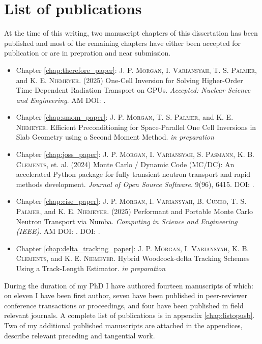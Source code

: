 \section{List of publications}

At the time of this writing, two manuscript chapters of this dissertation has been published and most of the remaining chapters have either been accepted for publication or are in prepration and near submission.
\begin{itemize}
    \item Chapter \ref{chap:therefore_paper}: \textsc{J. P. Morgan}, \textsc{I. Variansyah}, \textsc{T. S. Palmer}, and \textsc{K. E. Niemeyer}. (2025) One-Cell Inversion for Solving Higher-Order Time-Dependent Radiation Transport on GPUs. \emph{Accepted: Nuclear Science and Engineering}. AM DOI: .

    \item Chapter \ref{chap:smom_paper}: \textsc{J. P. Morgan},  \textsc{T. S. Palmer}, and \textsc{K. E. Niemeyer}. Efficient Preconditioning for Space-Parallel One Cell Inversions in Slab Geometry using a Second Moment Method. \emph{in preparation}

    \item Chapter \ref{chap:joss_paper}: \textsc{J. P. Morgan}, \textsc{I. Variansyah}, \textsc{S. Pasmann}, \textsc{K. B. Clements}, et. al. (2024) Monte Carlo / Dynamic Code (MC/DC): An accelerated Python package for fully transient neutron transport and rapid methods development. \emph{Journal of Open Source Software}. 9(96), 6415. DOI: .

    \item Chapter \ref{chap:cise_paper}: \textsc{J. P. Morgan}, \textsc{I. Variansyah}, \textsc{B. Cuneo}, \textsc{T. S. Palmer}, and \textsc{K. E. Niemeyer}. (2025) Performant and Portable Monte Carlo Neutron Transport via Numba. \emph{Computing in Science and Engineering (IEEE)}. AM DOI: . DOI: .

    \item Chapter \ref{chap:delta_tracking_paper}: \textsc{J. P. Morgan}, \textsc{I. Variansyah}, \textsc{K. B. Clements}, and \textsc{K. E. Niemeyer}. Hybrid Woodcock-delta Tracking Schemes Using a Track-Length Estimator. \emph{in preparation}
    
\end{itemize}

During the duration of my PhD I have authored fourteen manuscripts of which: on eleven I have been first author, seven have been published in peer-reviewer conference transactions or proceedings, and four have been published in field relevant journals.
A complete list of publications is in appendix \ref{chap:listopusb}.
Two of my additional published manuscripts are attached in the appendices, describe relevant preceding and tangential work.